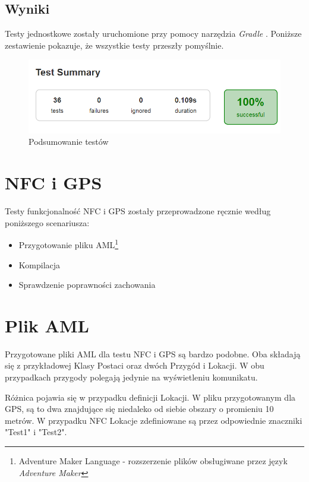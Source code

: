 \documentclass[openright]{xmgr}
\begin{document}
\subsection{Wyniki}
Testy jednostkowe zostały uruchomione przy pomocy narzędzia \textit{Gradle} \cite{Gradle:2017:Doc}. Poniższe zestawienie pokazuje, że wszystkie testy przeszły pomyślnie.

\begin{figure}[!tbh]
	\centering
	\includegraphics[width=1.0\hsize]{fig/test_summary}
	\caption{Podsumowanie testów}
\end{figure}

\section{NFC i GPS}

Testy funkcjonalność NFC i GPS zostały przeprowadzone ręcznie według poniższego scenariusza:

\begin{itemize}
  \item Przygotowanie pliku AML\footnote{Adventure Maker Language - rozszerzenie plików obsługiwane przez język \textit{Adventure Maker}}
  \item Kompilacja
  \item Sprawdzenie poprawności zachowania
\end{itemize}

\section{Plik AML}

Przygotowane pliki AML dla testu NFC i GPS są bardzo podobne. Oba składają się z przykładowej Klasy Postaci oraz dwóch Przygód i Lokacji. W obu przypadkach przygody polegają jedynie na wyświetleniu komunikatu. 

Różnica pojawia się w przypadku definicji Lokacji. W pliku przygotowanym dla GPS, są to dwa znajdujące się niedaleko od siebie obszary o promieniu 10 metrów. W przypadku NFC Lokacje zdefiniowane są przez odpowiednie znaczniki "Test1" i "Test2".
\end{document}
